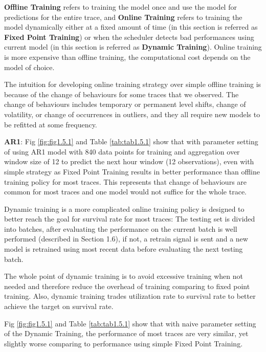\documentclass{article}
\begin{document}
\begin{flushleft}
\textbf{Offline Training} refers to training the model once and use the model for predictions for the entire trace, and \textbf{Online Training} refers to training the model dynamically either at a fixed amount of time (in this section is referred as \textbf{Fixed Point Training}) or when the scheduler detects bad performances using current model (in this section is referred as \textbf{Dynamic Training}). Online training is more expensive than offline training, the computational cost depends on the model of choice.
\end{flushleft}

\begin{flushleft}
The intuition for developing online training strategy over simple offline training is because of the change of behaviours for some traces that we observed. The change of behaviours includes temporary or permanent level shifts, change of volatility, or change of occurrences in outliers, and they all require new models to be refitted at some frequency.
\end{flushleft}

\begin{flushleft}
\textbf{AR1}: Fig \ref{fig:fig1.5.1} and Table \ref{tab:tab1.5.1} show that with parameter setting of using AR1 model with 840 data points for training and aggregation over window size of 12 to predict the next hour window (12 observations), even with simple strategy as Fixed Point Training results in better performance than offline training policy for most traces. This represents that change of behaviours are common for most traces and one model would not suffice for the whole trace.
\end{flushleft}

\begin{flushleft}
Dynamic training is a more complicated online training policy is designed to better reach the goal for survival rate for most traces: The testing set is divided into batches, after evaluating the performance on the current batch is well performed (described in Section 1.6), if not, a retrain signal is sent and a new model is retrained using most recent data before evaluating the next testing batch. 

The whole point of dynamic training is to avoid excessive training when not needed and therefore reduce the overhead of training comparing to fixed point training. Also, dynamic training trades utilization rate to survival rate to better achieve the target on survival rate.

Fig \ref{fig:fig1.5.1} and Table \ref{tab:tab1.5.1} show that with naive parameter setting of the Dynamic Training, the performance of most traces are very similar, yet slightly worse comparing to performance using simple Fixed Point Training.
\end{flushleft}
\end{document}
